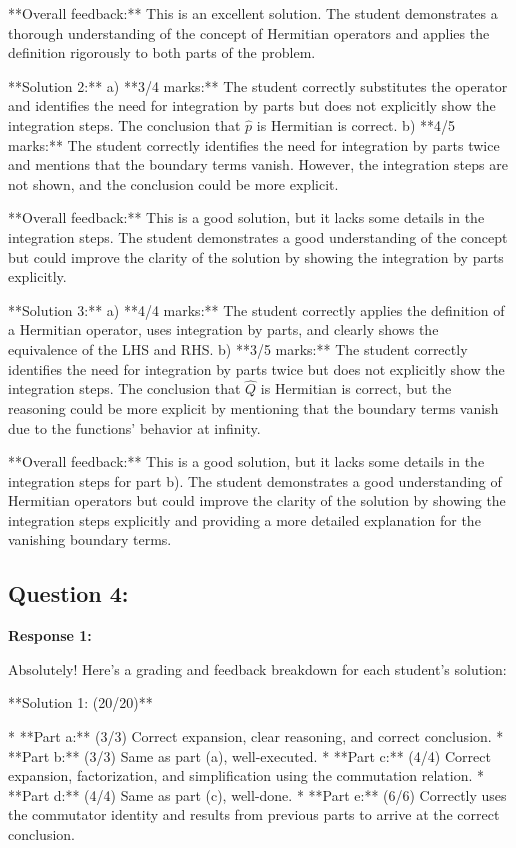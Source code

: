 \documentclass[a4paper,11pt]{article}
\begin{document}
**Overall feedback:** This is an excellent solution. The student demonstrates a thorough understanding of the concept of Hermitian operators and applies the definition rigorously to both parts of the problem.

**Solution 2:**
a) **3/4 marks:** The student correctly substitutes the operator and identifies the need for integration by parts but does not explicitly show the integration steps. The conclusion that \( \hat{p} \) is Hermitian is correct.
b) **4/5 marks:** The student correctly identifies the need for integration by parts twice and mentions that the boundary terms vanish. However, the integration steps are not shown, and the conclusion could be more explicit.

**Overall feedback:** This is a good solution, but it lacks some details in the integration steps. The student demonstrates a good understanding of the concept but could improve the clarity of the solution by showing the integration by parts explicitly.

**Solution 3:**
a) **4/4 marks:** The student correctly applies the definition of a Hermitian operator, uses integration by parts, and clearly shows the equivalence of the LHS and RHS.
b) **3/5 marks:** The student correctly identifies the need for integration by parts twice but does not explicitly show the integration steps. The conclusion that \( \hat{Q} \) is Hermitian is correct, but the reasoning could be more explicit by mentioning that the boundary terms vanish due to the functions' behavior at infinity.

**Overall feedback:** This is a good solution, but it lacks some details in the integration steps for part b). The student demonstrates a good understanding of Hermitian operators but could improve the clarity of the solution by showing the integration steps explicitly and providing a more detailed explanation for the vanishing boundary terms.


\subsection*{Question 4:}

\textbf{Response 1:}

Absolutely! Here's a grading and feedback breakdown for each student's solution:

**Solution 1: (20/20)**

*   **Part a:** (3/3) Correct expansion, clear reasoning, and correct conclusion.
*   **Part b:** (3/3) Same as part (a), well-executed.
*   **Part c:** (4/4) Correct expansion, factorization, and simplification using the commutation relation.
*   **Part d:** (4/4) Same as part (c), well-done.
*   **Part e:** (6/6) Correctly uses the commutator identity and results from previous parts to arrive at the correct conclusion.
\end{document}
